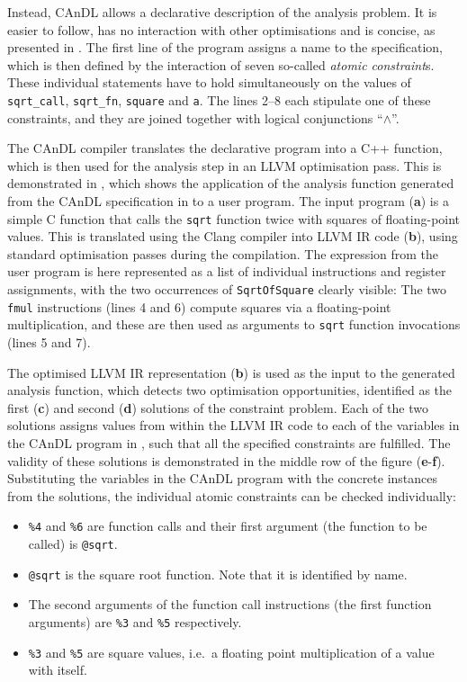     Instead, CAnDL allows a declarative description of the analysis problem.
    It is easier to follow, has no interaction with other optimisations and
    is concise, as presented in .
    The first line of the program assigns a name to the specification, which is
    then defined by the interaction of seven so-called {\em atomic constraint}s.
    These individual statements have to hold simultaneously on the values of
    \texttt{sqrt\_call}, \texttt{sqrt\_fn}, \texttt{square} and \texttt{a}.
    The lines 2--8 each stipulate one of these constraints, and they are joined
    together with logical conjunctions ``$\land$''.

    The CAnDL compiler translates the declarative program into a C++ function,
    which is then used for the analysis step in an LLVM optimisation pass.
    This is demonstrated in , which shows the application
    of the analysis function generated from the CAnDL specification in
     to a user program.
    The input program ({\bf a}) is a simple C function that calls the
    \texttt{sqrt} function twice with squares of floating-point values.
    This is translated using the Clang compiler into LLVM IR code ({\bf b}),
    using standard optimisation passes during the compilation.
    The expression from the user program is here represented as a list of
    individual instructions and register assignments, with the two occurrences
    of \texttt{SqrtOfSquare} clearly visible:
    The two \texttt{fmul} instructions (lines 4 and 6) compute squares via a
    floating-point multiplication, and these are then used as arguments to
    \texttt{sqrt} function invocations (lines 5 and 7).

    The optimised LLVM IR representation ({\bf b}) is used as the input to the
    generated analysis function, which detects two optimisation opportunities,
    identified as the first ({\bf c}) and second ({\bf d}) solutions of the
    constraint problem.
    Each of the two solutions assigns values from within the LLVM IR code to
    each of the variables in the CAnDL program in , such
    that all the specified constraints are fulfilled.
    The validity of these solutions is demonstrated in the middle row of the
    figure ({\bf e}-{\bf f}).
    Substituting the variables in the CAnDL program with the concrete instances
    from the solutions, the individual atomic constraints can be checked
    individually:
    \begin{itemize}
    \item \texttt{\%4} and \texttt{\%6} are function calls and their first
          argument (the function to be called) is \texttt{@sqrt}.
    \item \texttt{@sqrt} is the square root function.
          Note that it is identified by name.
    \item The second arguments of the function call instructions (the first
          function arguments) are \texttt{\%3} and \texttt{\%5}
          respectively.
    \item \texttt{\%3} and \texttt{\%5} are square values, i.e.\ a floating
          point multiplication of a value with itself.
    \end{itemize}

